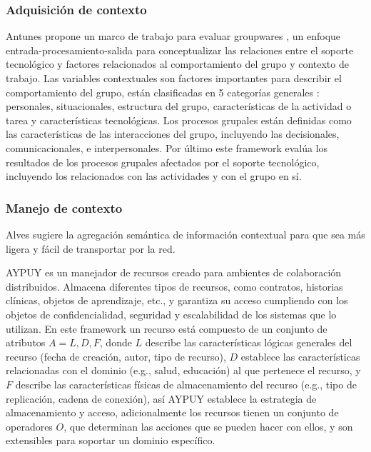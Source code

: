 \subsubsection {Adquisici\'on de contexto}
 Antunes propone un marco de trabajo para evaluar groupwares \cite{antunes2008structuring}, un enfoque entrada-procesamiento-salida para conceptualizar las relaciones entre el soporte tecnol\'ogico y factores relacionados al comportamiento del grupo y contexto de trabajo. Las variables contextuales son factores importantes para describir el comportamiento del grupo, est\'an clasificadas en 5 categor\'ias generales \cite{antunes2008structuring}: personales, situacionales, estructura del grupo, caracter\'isticas de la actividad o tarea y caracter\'isticas tecnol\'ogicas. Los procesos grupales est\'an definidas como las caracter\'isticas de las interacciones del grupo, incluyendo las decisionales, comunicacionales, e interpersonales. Por \'ultimo este framework eval\'ua los resultados de los procesos grupales afectados por el soporte tecnol\'ogico, incluyendo los relacionados con las actividades y con el grupo en s\'i.

\subsubsection {Manejo de contexto}
Alves \cite{alves2013radiator} sugiere la agregaci\'on sem\'antica de informaci\'on contextual para que sea m\'as ligera y f\'acil de transportar por la red.

AYPUY es un manejador de recursos creado para ambientes de colaboraci\'on distribuidos.  Almacena diferentes tipos de recursos, como contratos, historias cl\'inicas, objetos de aprendizaje, etc., y garantiza su acceso cumpliendo con los objetos de confidencialidad, seguridad y escalabilidad de los sistemas que lo utilizan. En este framework un recurso est\'a compuesto de un conjunto de atributos $A = { L, D, F }$, donde $L$ describe las caracter\'isticas l\'ogicas generales del recurso (fecha de creaci\'on, autor, tipo de recurso), $D$ establece las caracter\'isticas relacionadas con el dominio (e.g., salud, educaci\'on) al que pertenece el recurso, y $F$ describe las caracter\'isticas f\'isicas de almacenamiento del recurso (e.g., tipo de replicaci\'on, cadena de conexi\'on), as\'i AYPUY establece la estrategia de almacenamiento y acceso, adicionalmente los recursos tienen un conjunto de operadores $O$, que determinan las acciones que se pueden hacer con ellos, y son extensibles para soportar un dominio espec\'ifico.

